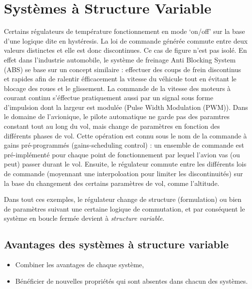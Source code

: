 \section{Systèmes à Structure Variable}
Certains régulateurs de température fonctionnement en mode ‘on/off’ sur la base d'une logique dite en  hystéresis. La loi de commande générée commute entre deux valeurs distinctes et elle est donc discontinues. Ce cas de figure n'est pas isolé. En effet dans l'industrie automobile, le système de freinage Anti Blocking System (ABS) se base sur un concept similaire : effectuer des coups de frein discontinus et rapides afin de ralentir éfficacement la vitesse du véhicule tout en évitant le blocage des roues et le glissement. La commande de la vitesse des moteurs à courant continu s'éffectue pratiquement aussi par un signal sous forme d'impulsion dont la largeur est modulée (Pulse Width Modulation (PWM)). Dans le domaine de l'avionique, le pilote automatique ne garde pas des paramtres constant tout au long du vol, mais change de paramètres en fonction des différents phases de vol. Cette opération est connu sous le nom  de la commande à gains pré-programmés (gains-scheduling control) : un ensemble de commande est pré-implémenté pour chaque point de fonctionnement par lequel l'avion vas (ou peut) passer durant le vol. Ensuite, le régulateur commute entre les différents lois de commande (moyennant une interpoloation pour limiter les discontinuités) sur la base du changement des certains paramètres de vol, comme l'altitude.  

Dans tout ces exemples, le régulateur change de structure (formulation) ou bien de paramètres suivant une certaine logique de commutation, et par conséquent le système en boucle fermée devient à \emph{structure variable}.
\subsection{Avantages des systèmes à structure variable}
\begin{itemize}
	\item Combiner les avantages de chaque système,
	\item Bénéficier de nouvelles propriétés qui sont absentes dans chacun des systèmes. 
\end{itemize}